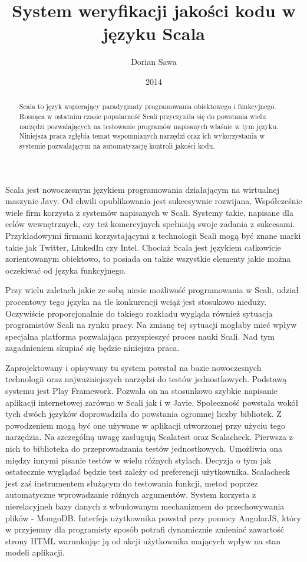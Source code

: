 \documentclass[brudnopis]{xmgr}
\author   {Dorian Sawa}
\title    {System weryfikacji jakości kodu w języku Scala}
\date     {2014}
\begin{document}
\begin{abstract}
Scala to język wspierający paradygmaty programowania obiektowego i funkcyjnego. Rosnąca w ostatnim czasie popularność Scali przyczyniła się do powstania wielu narzędzi pozwalających na testowanie programów napisanych właśnie w tym języku. Niniejsza praca zgłębia temat wspomnianych narzędzi oraz ich wykorzystania w systemie pozwalającym na automatyzację kontroli jakości kodu.
\end{abstract}

\maketitle
%
\introduction Scala jest nowoczesnym językiem programowania działającym na wirtualnej maszynie Javy. Od chwili opublikowania jest sukcesywnie rozwijana. Współcześnie wiele firm korzysta z systemów napisanych w Scali. Systemy takie, napisane dla celów wewnętrznych, czy też komercyjnych spełniają swoje zadania z sukcesami. Przykładowymi firmami korzystającymi z technologii Scali mogą być znane marki takie jak Twitter, LinkedIn czy Intel. Chociaż Scala jest językiem całkowicie zorientowanym obiektowo, to posiada on także wszystkie elementy jakie można oczekiwać od języka funkcyjnego.

Przy wielu zaletach jakie ze sobą niesie możliwość programowania w Scali, udział procentowy tego języka na tle konkurencji wciąż jest stosukowo nieduży. Oczywiście proporcjonalnie do takiego rozkładu wygląda również sytuacja programistów Scali na rynku pracy. Na zmianę tej sytuacji mogłaby mieć wpływ specjalna platforma pozwalająca przyspieszyć proces nauki Scali. Nad tym zagadnieniem skupiać się będzie niniejsza praca.

Zaprojektowany i opisywany tu system powstał na bazie nowoczesnych technologii oraz najważniejszych narzędzi do testów jednostkowych. Podstawą systemu jest Play Framework. Pozwala on na stosunkowo szybkie napisanie aplikacji internetowej zarówno w Scali jak i w Javie. Społeczność powstała wokół tych dwóch języków doprowadziła do powstania ogromnej liczby bibliotek. Z powodzeniem mogą być one używane w aplikacji utworzonej przy użyciu tego narzędzia. 
Na szczególną uwagę zasługują Scalatest oraz Scalacheck. Pierwsza z nich to biblioteka do przeprowadzania testów jednostkowych. Umożliwia ona między innymi pisanie testów w wielu różnych stylach. Decyzja o tym jak ostatecznie wyglądać będzie test zależy od preferencji użytkownika. Scalacheck jest zaś instrumentem służącym do testowania funkcji, metod poprzez automatyczne wprowadzanie różnych argumentów. System korzysta z nierelacyjneh bazy danych z wbudowanym mechanizmem do przechowywania plików - MongoDB. Interfejs użytkownika powstał przy pomocy AngularJS, który w przyjemny dla programisty sposób  potrafi dynamicznie zmieniać zawartość strony HTML warunkując ją od akcji użytkownika mających wpływ na stan modeli aplikacji.
\end{document}
